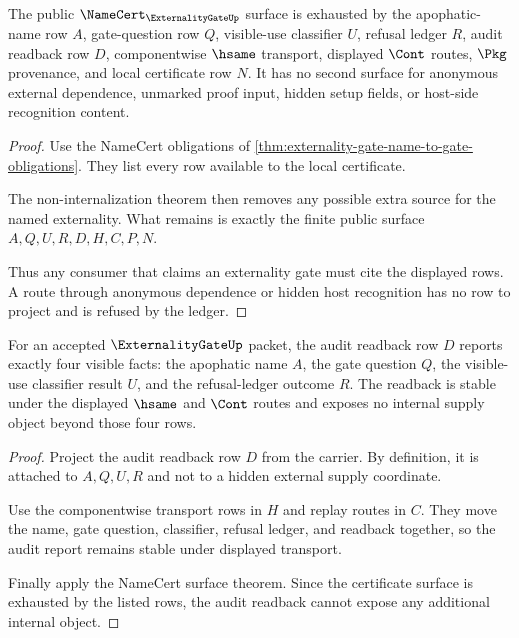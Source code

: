 \begin{theorem}
\label{thm:externality-gate-namecert-surface}
The public $\NameCert_{\ExternalityGateUp}$ surface is exhausted by the
apophatic-name row $A$, gate-question row $Q$, visible-use classifier $U$,
refusal ledger $R$, audit readback row $D$, componentwise $\hsame$ transport,
displayed $\Cont$ routes, $\Pkg$ provenance, and local certificate row $N$.
It has no second surface for anonymous external dependence, unmarked proof
input, hidden setup fields, or host-side recognition content.
\end{theorem}
\begin{proof}
Use the NameCert obligations of
\autoref{thm:externality-gate-name-to-gate-obligations}. They list every row
available to the local certificate.

The non-internalization theorem then removes any possible extra source for the
named externality. What remains is exactly the finite public surface
$A,Q,U,R,D,H,C,P,N$.

Thus any consumer that claims an externality gate must cite the displayed rows.
A route through anonymous dependence or hidden host recognition has no row to
project and is refused by the ledger.
\end{proof}

\begin{theorem}
\label{thm:externality-gate-audit-readback}
For an accepted $\ExternalityGateUp$ packet, the audit readback row $D$ reports
exactly four visible facts: the apophatic name $A$, the gate question $Q$, the
visible-use classifier result $U$, and the refusal-ledger outcome $R$. The
readback is stable under the displayed $\hsame$ and $\Cont$ routes and exposes
no internal supply object beyond those four rows.
\end{theorem}
\begin{proof}
Project the audit readback row $D$ from the carrier. By definition, it is
attached to $A,Q,U,R$ and not to a hidden external supply coordinate.

Use the componentwise transport rows in $H$ and replay routes in $C$. They move
the name, gate question, classifier, refusal ledger, and readback together, so
the audit report remains stable under displayed transport.

Finally apply the NameCert surface theorem. Since the certificate surface is
exhausted by the listed rows, the audit readback cannot expose any additional
internal object.
\end{proof}

